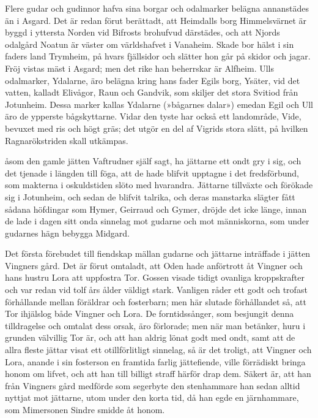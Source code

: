 Flere gudar och gudinnor hafva sina borgar och odalmarker belägna
annanstädes än i Asgard. Det är redan förut berättadt, att Heimdalls
borg Himmelsvärnet är byggd i yttersta Norden vid Bifrosts brohufvud
därstädes, och att Njords odalgård Noatun är väster om världshafvet i
Vanaheim. Skade bor hälst i sin faders land Trymheim, på hvars
fjällsidor och slätter hon går på skidor och jagar. Fröj vistas mäst i
Asgard; men det rike han beherrskar är Alfheim. Ulls odalmarker,
Ydalarne, äro belägna kring hans fader Egils borg, Ysäter, vid det
vatten, kalladt Elivågor, Raun och Gandvik, som skiljer det stora
Svitiod från Jotunheim. Dessa marker kallas Ydalarne (»bågarnes dalar»)
emedan Egil och Ull äro de ypperste bågskyttarne. Vidar den tyste har
också ett landområde, Vide, bevuxet med ris och högt gräs; det utgör en
del af Vigrids stora slätt, på hvilken Ragnarökstriden skall utkämpas.

\endSecII


\dropcapS åsom den gamle jätten Vaftrudner själf sagt, ha jättarne ett ondt gry i
sig, och det tjenade i längden till föga, att de hade blifvit upptagne i
det fredsförbund, som makterna i oskuldstiden slöto med hvarandra.
Jättarne tillväxte och förökade sig i Jotunheim, och sedan de blifvit
talrika, och deras manstarka slägter fått sådana höfdingar som Hymer,
Geirraud och Gymer, dröjde det icke länge, innan de lade i dagen sitt
onda sinnelag mot gudarne och mot människorna, som under gudarnes hägn
bebygga Midgard.

Det första förebudet till fiendskap mällan gudarne och jättarne
inträffade i jätten Vingners gård. Det är förut omtaladt, att Oden hade
anförtrott åt Vingner och hans hustru Lora att uppfostra Tor. Gossen
visade tidigt ovanliga kroppskrafter och var redan vid tolf års ålder
väldigt stark. Vanligen råder ett godt och trofast förhållande mellan
föräldrar och fosterbarn; men här slutade förhållandet så, att Tor
ihjälslog både Vingner och Lora. De forntidssånger, som besjungit denna
tilldragelse och omtalat dess orsak, äro förlorade; men när man
betänker, huru i grunden välvillig Tor är, och att han aldrig lönat godt
med ondt, samt att de allra fleste jättar visat ett otillförlitligt
sinnelag, så är det troligt, att Vingner och Lora, anande i sin
fosterson en framtida farlig jättefiende, ville förrädiskt bringa honom
om lifvet, och att han till billigt straff härför drap dem. Säkert är,
att han från Vingners gård medförde som segerbyte den stenhammare han
sedan alltid nyttjat mot jättarne, utom under den korta tid, då han egde
en järnhammare, som Mimersonen Sindre smidde åt honom.

